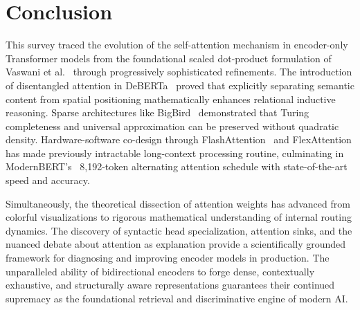 \documentclass[11pt]{article}
\begin{document}
\section{Conclusion}

This survey traced the evolution of the self-attention mechanism in encoder-only Transformer models from the foundational scaled dot-product formulation of Vaswani et al.~\cite{vaswani2017attention} through progressively sophisticated refinements. The introduction of disentangled attention in DeBERTa~\cite{he2020deberta} proved that explicitly separating semantic content from spatial positioning mathematically enhances relational inductive reasoning. Sparse architectures like BigBird~\cite{zaheer2020big} demonstrated that Turing completeness and universal approximation can be preserved without quadratic density. Hardware-software co-design through FlashAttention~\cite{dao2022flashattention} and FlexAttention has made previously intractable long-context processing routine, culminating in ModernBERT's~\cite{warner2024smarter} 8,192-token alternating attention schedule with state-of-the-art speed and accuracy.

Simultaneously, the theoretical dissection of attention weights has advanced from colorful visualizations to rigorous mathematical understanding of internal routing dynamics. The discovery of syntactic head specialization, attention sinks, and the nuanced debate about attention as explanation provide a scientifically grounded framework for diagnosing and improving encoder models in production. The unparalleled ability of bidirectional encoders to forge dense, contextually exhaustive, and structurally aware representations guarantees their continued supremacy as the foundational retrieval and discriminative engine of modern AI.



\end{document}
